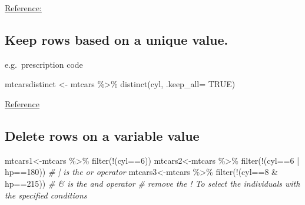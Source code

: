 \documentclass[
]{article}
\newenvironment{Shaded}{\begin{snugshade}}{\end{snugshade}}
\newcommand{\AttributeTok}[1]{\textcolor[rgb]{0.77,0.63,0.00}{#1}}
\newcommand{\CommentTok}[1]{\textcolor[rgb]{0.56,0.35,0.01}{\textit{#1}}}
\newcommand{\ConstantTok}[1]{\textcolor[rgb]{0.00,0.00,0.00}{#1}}
\newcommand{\DecValTok}[1]{\textcolor[rgb]{0.00,0.00,0.81}{#1}}
\newcommand{\FunctionTok}[1]{\textcolor[rgb]{0.00,0.00,0.00}{#1}}
\newcommand{\NormalTok}[1]{#1}
\newcommand{\OtherTok}[1]{\textcolor[rgb]{0.56,0.35,0.01}{#1}}
\newcommand{\SpecialCharTok}[1]{\textcolor[rgb]{0.00,0.00,0.00}{#1}}
\begin{document}
\href{http://r-statistics.co/Missing-Value-Treatment-With-R.html}{Reference:}

\hypertarget{keep-rows-based-on-a-unique-value.}{%
\subsection{Keep rows based on a unique value.}\label{keep-rows-based-on-a-unique-value.}}

e.g.~prescription code

\begin{Shaded}
\begin{Highlighting}[]
\NormalTok{mtcarsdistinct }\OtherTok{\textless{}{-}}\NormalTok{ mtcars }\SpecialCharTok{\%\textgreater{}\%}    \FunctionTok{distinct}\NormalTok{(cyl, }\AttributeTok{.keep\_all=} \ConstantTok{TRUE}\NormalTok{)}
\end{Highlighting}
\end{Shaded}

\href{http://www.datasciencemadesimple.com/remove-duplicate-rows-r-using-dplyr-distinct-function}{Reference}

\hypertarget{delete-rows-on-a-variable-value}{%
\subsection{Delete rows on a variable value}\label{delete-rows-on-a-variable-value}}

\begin{Shaded}
\begin{Highlighting}[]
\NormalTok{mtcars1}\OtherTok{\textless{}{-}}\NormalTok{mtcars }\SpecialCharTok{\%\textgreater{}\%} \FunctionTok{filter}\NormalTok{(}\SpecialCharTok{!}\NormalTok{(cyl}\SpecialCharTok{==}\DecValTok{6}\NormalTok{))}
\NormalTok{mtcars2}\OtherTok{\textless{}{-}}\NormalTok{mtcars }\SpecialCharTok{\%\textgreater{}\%} \FunctionTok{filter}\NormalTok{(}\SpecialCharTok{!}\NormalTok{(cyl}\SpecialCharTok{==}\DecValTok{6} \SpecialCharTok{|}\NormalTok{ hp}\SpecialCharTok{==}\DecValTok{180}\NormalTok{)) }\CommentTok{\# | is the \textquotesingle{}or\textquotesingle{} operator}
\NormalTok{mtcars3}\OtherTok{\textless{}{-}}\NormalTok{mtcars }\SpecialCharTok{\%\textgreater{}\%} \FunctionTok{filter}\NormalTok{(}\SpecialCharTok{!}\NormalTok{(cyl}\SpecialCharTok{==}\DecValTok{8} \SpecialCharTok{\&}\NormalTok{ hp}\SpecialCharTok{==}\DecValTok{215}\NormalTok{)) }\CommentTok{\# \& is the \textquotesingle{}and\textquotesingle{} operator}
\CommentTok{\# remove the ! To select the individuals with the specified conditions}
\end{Highlighting}
\end{Shaded}
\end{document}
